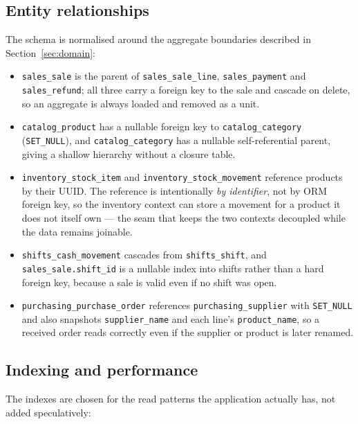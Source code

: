 \documentclass[11pt,a4paper]{article}
\begin{document}
\subsection{Entity relationships}

The schema is normalised around the aggregate boundaries described in Section~\ref{sec:domain}:

\begin{itemize}[leftmargin=1.4em]
  \item \texttt{sales\_sale} is the parent of \texttt{sales\_sale\_line}, \texttt{sales\_payment}
  and \texttt{sales\_refund}; all three carry a foreign key to the sale and cascade on delete, so an
  aggregate is always loaded and removed as a unit.
  \item \texttt{catalog\_product} has a nullable foreign key to \texttt{catalog\_category}
  (\texttt{SET\_NULL}), and \texttt{catalog\_category} has a nullable self-referential parent,
  giving a shallow hierarchy without a closure table.
  \item \texttt{inventory\_stock\_item} and \texttt{inventory\_stock\_movement} reference products by
  their UUID. The reference is intentionally \emph{by identifier}, not by ORM foreign key, so the
  inventory context can store a movement for a product it does not itself own --- the seam that keeps
  the two contexts decoupled while the data remains joinable.
  \item \texttt{shifts\_cash\_movement} cascades from \texttt{shifts\_shift}, and
  \texttt{sales\_sale.shift\_id} is a nullable index into shifts rather than a hard foreign key,
  because a sale is valid even if no shift was open.
  \item \texttt{purchasing\_purchase\_order} references \texttt{purchasing\_supplier} with
  \texttt{SET\_NULL} and also snapshots \texttt{supplier\_name} and each line's \texttt{product\_name},
  so a received order reads correctly even if the supplier or product is later renamed.
\end{itemize}

\subsection{Indexing and performance}

The indexes are chosen for the read patterns the application actually has, not added speculatively:
\end{document}
